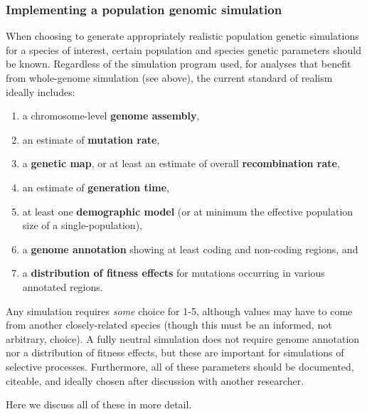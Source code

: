 \documentclass[hidelinks]{article}
\providecommand{\tightlist}{%
\setlength{\itemsep}{0pt}\setlength{\parskip}{0pt}}
\begin{document}
\hypertarget{implementing-a-population-genomic-simulation}{%
\subsubsection*{Implementing a population genomic
simulation}\label{implementing-a-population-genomic-simulation}}

When choosing to generate appropriately realistic population genetic
simulations for a species of interest, certain population and species
genetic parameters should be known. Regardless of the simulation program used,
for analyses that benefit from whole-genome simulation (see above), 
the current standard of realism ideally includes:

\begin{enumerate}
\def\labelenumi{\arabic{enumi}.}
\tightlist
\item
  a chromosome-level \textbf{genome assembly},
\item
  an estimate of \textbf{mutation rate},
\item
  a \textbf{genetic map}, or at least an estimate of overall \textbf{recombination rate},
\item
  an estimate of \textbf{generation time},
\item
  at least one \textbf{demographic model} (or at minimum the effective
  population size of a single-population),
\item
  a \textbf{genome annotation} showing at least coding and non-coding
  regions, and
\item
  a \textbf{distribution of fitness effects} for mutations occurring in
  various annotated regions.
\end{enumerate}

Any simulation requires \emph{some} choice for 1-5, although values may
have to come from another closely-related species (though this must be
an informed, not arbitrary, choice). A fully neutral simulation does not
require genome annotation nor a distribution of fitness effects, but
these are important for simulations of selective processes. Furthermore,
all of these parameters should be documented, citeable, and
ideally chosen after discussion with another researcher.

Here we discuss all of these in more detail.
\end{document}
